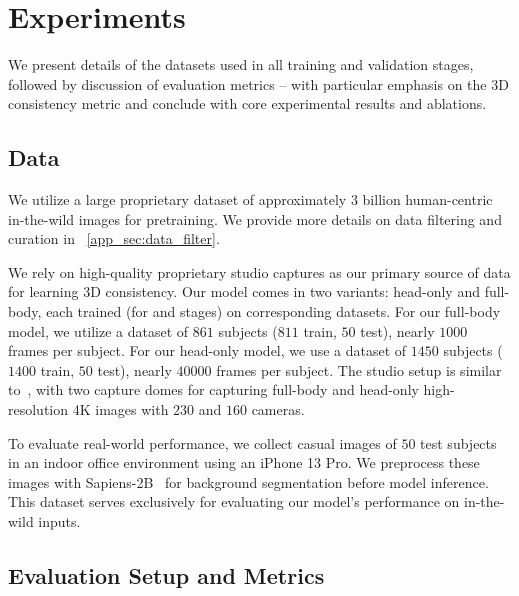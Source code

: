 
\section{Experiments}
\label{sec:experiments}

We present details of the datasets used in all training and validation stages, followed by discussion of evaluation metrics -- with particular emphasis on the 3D consistency metric and conclude with core experimental results and ablations.

\subsection{Data} 
\label{ssec:data}

We utilize a large proprietary dataset of approximately $3$ billion human-centric in-the-wild images for pretraining.
We provide more details on data filtering and curation in ~\cref{app_sec:data_filter}.

\vspace{1mm}
 We rely on high-quality proprietary studio captures as our primary source of data for learning 3D consistency. 
Our model comes in two variants: head-only and full-body, each trained 
(for \midtraining and \posttraining stages) on corresponding datasets.  For our full-body model, we utilize a dataset of $861$ subjects ($811$ train, $50$ test), nearly $1000$ frames per subject.
For our head-only model, we use a dataset of $1450$ subjects ($1400$ train, $50$ test), nearly $40000$ frames per subject. The studio setup is similar to~\cite{martinez2024codec}, with two capture domes for capturing full-body and head-only high-resolution 4K images with $230$ and $160$ cameras.


\vspace{1mm}
 To evaluate real-world performance, we collect casual images
of $50$ test subjects in an indoor office environment using an iPhone 13 Pro. We preprocess these images with Sapiens-2B~\cite{khirodkar2025sapiens} for
background segmentation before model inference. This dataset serves exclusively for evaluating our model's performance on in-the-wild inputs.



\subsection{Evaluation Setup and Metrics}

